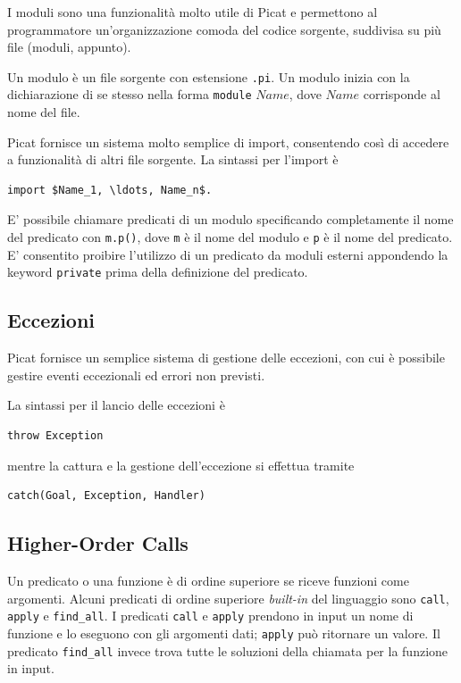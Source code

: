 \documentclass[12pt,a4paper,openright]{book} %
\begin{document}
I moduli sono una funzionalità molto utile di Picat e permettono al programmatore un'organizzazione comoda del codice sorgente, suddivisa su più file (moduli, appunto).

Un modulo è un file sorgente con estensione \verb|.pi|. Un modulo inizia con la dichiarazione di se stesso nella forma \verb|module| $Name$, dove $Name$ corrisponde al nome del file.

Picat fornisce un sistema molto semplice di import, consentendo così di accedere a funzionalità di altri file sorgente. La sintassi per l'import è 
\begin{lstlisting}
import $Name_1, \ldots, Name_n$.
\end{lstlisting}

E' possibile chiamare predicati di un modulo specificando completamente il nome del predicato con \verb|m.p()|, dove \verb|m| è il nome del modulo e \verb|p| è il nome del predicato. E' consentito proibire l'utilizzo di un predicato da moduli esterni appondendo la keyword \verb|private| prima della definizione del predicato.

\subsection{Eccezioni}
\label{sec:picat_advanced_exceptions}

Picat fornisce un semplice sistema di gestione delle eccezioni, con cui è possibile gestire eventi eccezionali ed errori non previsti.

La sintassi per il lancio delle eccezioni è 
\begin{lstlisting}
throw Exception
\end{lstlisting}
mentre la cattura e la gestione dell'eccezione si effettua tramite
\begin{lstlisting}
catch(Goal, Exception, Handler)
\end{lstlisting}

\subsection{Higher-Order Calls}
\label{sec:picat_advanced_hoc}

Un predicato o una funzione è di ordine superiore se riceve funzioni come argomenti. Alcuni predicati di ordine superiore \emph{built-in} del linguaggio sono \verb|call|, \verb|apply| e \verb|find_all|. I predicati \verb|call| e \verb|apply| prendono in input un nome di funzione e lo eseguono con gli argomenti dati; \verb|apply| può ritornare un valore. Il predicato \verb|find_all| invece trova tutte le soluzioni della chiamata per la funzione in input.
\end{document}
